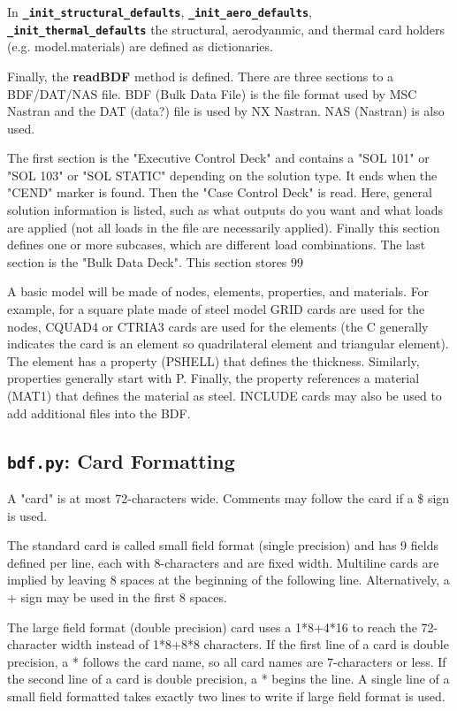      In {\bf \tt \_init\_structural\_defaults}, {\bf \tt \_init\_aero\_defaults}, {\bf \tt \_init\_thermal\_defaults} the structural, aerodyanmic, and thermal card holders (e.g. model.materials) are defined as dictionaries.

     Finally, the {\bf readBDF} method is defined.  There are three sections to a BDF/DAT/NAS file.  BDF (Bulk Data File) is the file format used by MSC Nastran and the DAT (data?) file is used by NX Nastran.  NAS (Nastran) is also used.

     The first section is the "Executive Control Deck" and contains a "SOL 101" or "SOL 103" or "SOL STATIC" depending on the solution type.  It ends when the "CEND" marker is found. Then the "Case Control Deck" is read.  Here, general solution information is listed, such  as what outputs do you want and what loads are applied (not all loads in the file are necessarily applied).  Finally this section defines one or more subcases, which are different load combinations.  The last section is the "Bulk Data Deck".  This section stores 99%
     
     A basic model will be made of nodes, elements, properties, and materials.  For example, for a square plate made of steel model GRID cards are used for the nodes, CQUAD4 or CTRIA3 cards are used for the elements (the C generally indicates the card is an element so quadrilateral element and triangular element).  The element has a property (PSHELL) that defines the thickness.  Similarly, properties generally start with P.  Finally,  the property references a material (MAT1) that defines the material as steel.  INCLUDE cards may also be used to add additional files into the BDF.
     
 \subsection{{\tt bdf.py}: Card Formatting}
     A "card" is at most 72-characters wide.  Comments may follow the card if a \$ sign is used.
     
     The standard card is called small field format (single precision) and has 9 fields defined per line, each with 8-characters and are fixed width.  Multiline cards are implied by leaving 8 spaces at the beginning of the following line.  Alternatively, a + sign may be used in the first 8 spaces.
     
     The large field format (double precision) card uses a 1*8+4*16 to reach the 72-character width instead of 1*8+8*8 characters.  If the first line of a card is double precision, a * follows the card name, so all card names are 7-characters or less.  If the second line of a card is double precision, a * begins the line.  A single line of a small field formatted takes exactly two lines to write if large field format is used.
     
